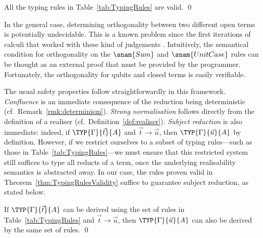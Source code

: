 \begin{theorem}\label{thm:TypingRulesValidity}
  All the typing rules in Table~\ref{tab:TypingRules} are valid.
  \qed
\end{theorem}

In the general case, determining orthogonality between two different open terms
is potentially undecidable. This is a known problem since the first iterations
of calculi that worked with these kind of judgements \cite{AltenkirchGrattageLICS05}.
Intuitively, the semantical condition for orthogonality on the $\snam{Sum}$ and
$\snam{UnitCase}$ rules can be thought as an external proof that must be provided by
the programmer. Fortunately, the orthogonality for qubits and closed terms is easily
verifiable.

The usual safety properties follow straightforwardly in this framework.
\emph{Confluence} is an immediate consequence of the reduction being
deterministic (cf.~Remark~\ref{rmk:determinism}).  
\emph{Strong normalisation} follows directly from the definition of a
realiser (cf.~Definition~\ref{def:realiser}).  
\emph{Subject reduction} is also immediate: indeed, if
$\TYP{\Gamma}{\vec{t}}{A}$ and $\vec{t}\to\vec{u}$, then
$\TYP{\Gamma}{\vec{u}}{A}$ by definition.
However, if we restrict ourselves to a subset of typing rules—such as those in Table~\ref{tab:TypingRules}—we must
ensure that this restricted system still suffices to type all reducts of a
term, once the underlying realisability semantics is abstracted away.  In our
case, the rules proven valid in Theorem~\ref{thm:TypingRulesValidity}
suffice to guarantee subject reduction, as
stated below.


\begin{theorem}\label{thm:SubjectReduction}
  If $\TYP{\Gamma}{\vec{t}}{A}$ can be derived using the set of rules in
  Table~\ref{tab:TypingRules} and $\vec{t}\to\vec{u}$, then
  $\TYP{\Gamma}{\vec{u}}{A}$ can also be derived by the same set of rules.
  \qed
\end{theorem}

